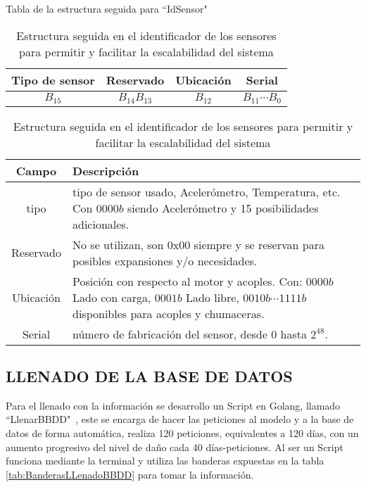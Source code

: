     \begin{table}[ht]
        \begin{center}
            Tabla de la estructura seguida para ``IdSensor"\  \\

            \vspace{0.3cm}
            \begin{tabular}{|c|c|c|c|}
                \hline
                Tipo de sensor & Reservado& Ubicación   & Serial \\\hline
                $ B_{15} $ & $ B_{14}B_{13} $ &$ B_{12} $  &  $ B_{11}\cdots B_{0} $\\
                \hline
            \end{tabular}

            \vspace{0.3cm}
            \begin{tabular}{|c|p{13cm}|}
                \hline
                Campo       & Descripción
                \\\hline\hline
                tipo        & tipo de sensor usado, Acelerómetro, Temperatura, etc.
                Con $0000b$ siendo Acelerómetro y 15 posibilidades adicionales.
                \\\hline
                Reservado   & No se utilizan, son 0x00 siempre y se reservan para
                posibles expansiones y/o necesidades.
                \\\hline
                Ubicación   & Posición con respecto al motor y acoples. Con:
                $0000b$ Lado con carga, $ 0001b$ Lado libre, $ 0010b\cdots1111b $
                disponibles para acoples y chumaceras.
                \\\hline
                Serial      & número de fabricación del sensor, desde 0 hasta $2^{48}$.
                \\\hline
            \end{tabular}
        \end{center}
        \caption[Estructura IdSensor]{Estructura seguida en el identificador de
        los sensores para permitir y facilitar la escalabilidad del sistema}
        \label{tab:CodIdSensor}
    \end{table}


\subsection{LLENADO DE LA BASE DE DATOS}
    Para el llenado con la información se desarrollo un Script en Golang,
    llamado ``LlenarBBDD"\ , este
    se encarga de hacer las peticiones al modelo y a la base de datos de forma
    automática, realiza 120 peticiones, equivalentes a 120 días, con un aumento
    progresivo del nivel de daño cada 40 días-peticiones. Al ser un Script funciona
    mediante la terminal y utiliza las banderas expuestas en la tabla
    \ref{tab:BanderasLLenadoBBDD} para tomar la información.

